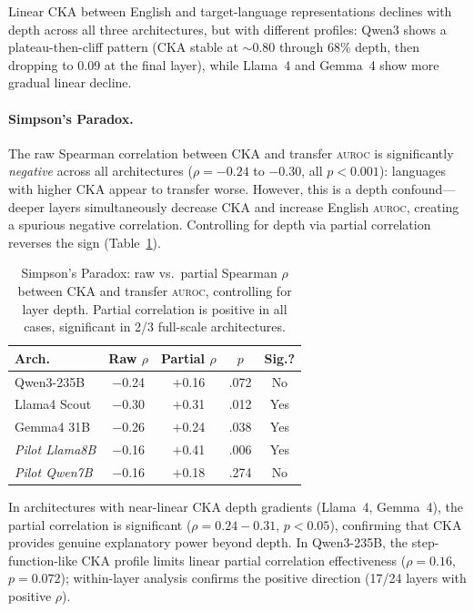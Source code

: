 \documentclass[11pt,a4paper]{article}
\newcommand{\aur}{\textsc{auroc}}
\newcommand{\cka}{\textsc{CKA}}
\begin{document}
Linear \cka{} between English and target-language representations declines with depth across all three architectures, but with different profiles: Qwen3 shows a plateau-then-cliff pattern (CKA stable at ${\sim}0.80$ through 68\% depth, then dropping to 0.09 at the final layer), while Llama~4 and Gemma~4 show more gradual linear decline.

\paragraph{Simpson's Paradox.}
The raw Spearman correlation between \cka{} and transfer \aur{} is significantly \emph{negative} across all architectures ($\rho = -0.24$ to $-0.30$, all $p < 0.001$): languages with higher \cka{} appear to transfer worse. However, this is a depth confound---deeper layers simultaneously decrease \cka{} and increase English \aur{}, creating a spurious negative correlation. Controlling for depth via partial correlation reverses the sign (Table~\ref{tab:simpson}).

\begin{table}[t]
\centering
\small
\begin{tabular}{lcccc}
\toprule
\textbf{Arch.} & \textbf{Raw $\rho$} & \textbf{Partial $\rho$} & \textbf{$p$} & \textbf{Sig.?} \\
\midrule
Qwen3-235B & $-$0.24 & $+$0.16 & .072 & No \\
Llama4 Scout & $-$0.30 & $+$0.31 & .012 & Yes \\
Gemma4 31B & $-$0.26 & $+$0.24 & .038 & Yes \\
\midrule
\emph{Pilot Llama8B} & $-$0.16 & $+$0.41 & .006 & Yes \\
\emph{Pilot Qwen7B} & $-$0.16 & $+$0.18 & .274 & No \\
\bottomrule
\end{tabular}
\caption{Simpson's Paradox: raw vs.\ partial Spearman $\rho$ between \cka{} and transfer \aur{}, controlling for layer depth. Partial correlation is positive in all cases, significant in 2/3 full-scale architectures.}
\label{tab:simpson}
\end{table}

In architectures with near-linear \cka{} depth gradients (Llama~4, Gemma~4), the partial correlation is significant ($\rho=0.24{-}0.31$, $p<0.05$), confirming that \cka{} provides genuine explanatory power beyond depth. In Qwen3-235B, the step-function-like \cka{} profile limits linear partial correlation effectiveness ($\rho=0.16$, $p=0.072$); within-layer analysis confirms the positive direction (17/24 layers with positive $\rho$).
\end{document}

